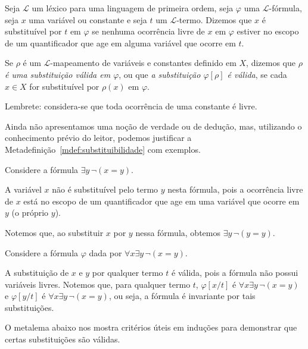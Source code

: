 \begin{metadefinition}\label{mdef:substituibilidade}
    Seja $\mathcal L$ um léxico para uma linguagem de primeira ordem, seja $\varphi$ uma $\mathcal L$-fórmula, seja $x$ uma variável ou constante e seja $t$ um $\mathcal L$-termo.
    Dizemos que $x$ é substituível por $t$ em  $\varphi$ se nenhuma ocorrência livre de $x$ em $\varphi$ estiver no escopo de um quantificador que age em alguma variável que ocorre em $t$.

    Se $\rho$ é um $\mathcal L$-mapeamento de variáveis e constantes definido em $X$, dizemos que \emph{$\rho$ é uma substituição válida em $\varphi$}, ou que \emph{a substituição $\varphi[\rho]$ é válida}, se cada $x \in X$ for substituível por $\rho(x)$ em $\varphi$.

    Lembrete: considera-se que toda ocorrência de uma constante é livre.
\end{metadefinition}

Ainda não apresentamos uma noção de verdade ou de dedução, mas, utilizando o conhecimento prévio do leitor, podemos justificar a Metadefinição~\ref{mdef:substituibilidade} com exemplos.

\begin{example}\label{exa:substituicaoInvalida}
    Considere a fórmula $\exists y \, \neg(x = y)$.

    A variável $x$ não é substituível pelo termo $y$ nesta fórmula, pois a ocorrência livre de $x$ está no escopo de um quantificador que age em uma variável que ocorre em $y$ (o próprio $y$).

    Notemos que, ao substituir $x$ por $y$ nessa fórmula, obtemos $\exists y \, \neg(y = y)$.
\end{example}

\begin{example}\label{exa:substituicaoSemVariaveisLivres}
    Considere a fórmula $\varphi$ dada por $\forall x \exists y \, \neg(x = y)$.

    A substituição de $x$ e $y$ por qualquer termo $t$ é válida, pois a fórmula não possui variáveis livres.
    Notemos que, para qualquer termo $t$, $\varphi[x/t]$ é $\forall x \exists y \, \neg(x = y)$ e $\varphi[y/t]$ é $\forall x \exists y \, \neg(x = y)$, ou seja, a fórmula é invariante por tais substituições.
\end{example}



O metalema abaixo nos mostra critérios úteis em induções para demonstrar que certas substituições são válidas.

